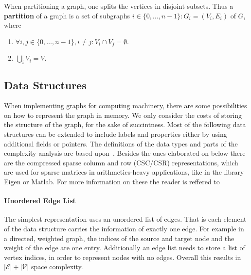             When partitioning a graph, one splits the vertices in disjoint subsets. 
            Thus a \textbf{partition} of a graph is a set of subgraphs $i\in \{0, \dots, n-1\}: G_i = (V_i, E_i)$ of $G$, where 
            \begin{enumerate}
             \item $\forall i,j \in \{0, \dots, n-1\}, i \neq j: V_i \cap V_j = \emptyset$.
             \item $\bigcup_i V_i = V$.
            \end{enumerate}
            
    \subsection{Data Structures}\label{\positionnumber}
        When implementing graphs for computing machinery, there are some possibilities on how to represent the graph in memory.
        We only consider the costs of storing the structure of the graph, for the sake of succintness. 
        Most of the following data structures can be extended to include labels and properties either by using additional fields or pointers. 
        The definitions of the data types and parts of the complexity analysis are based upon~\autocite{Gross1998GraphTA, aho1974design, cormen2009introduction, Goodrich2014AlgorithmDA, steinhaus2010g}. 
        Besides the ones elaborated on below there are the compressed sparse column and row (CSC/CSR) representations, which are used for sparse matrices in arithmetics-heavy applications, like in the library Eigen or Matlab. 
        For more information on these the reader is reffered to~\autocite{steinhaus2010g, Eisenstat1982YaleSM}
        
        \paragraph{Unordered Edge List}
        The simplest representation uses an unordered list of edges. 
        That is each element of the data structure carries the information of exactly one edge. 
        For example in a directed, weighted graph, the indices of the source and target node and the weight of the edge are one entry. 
        Additionally an edge list needs to store a list of vertex indices, in order to represent nodes with no edges.
        Overall this results in $\mathcal{|E| + |V|}$ space complexity. \\
        
